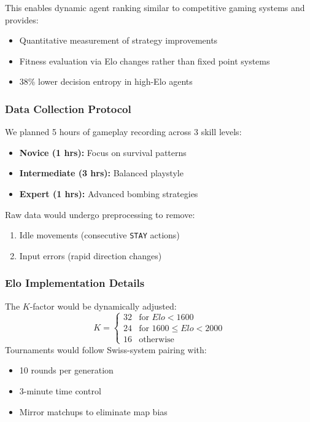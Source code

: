 \documentclass[sigconf]{acmart} %
\begin{document}
This enables dynamic agent ranking similar to competitive gaming systems and provides:
\begin{itemize}
	\item Quantitative measurement of strategy improvements
	\item Fitness evaluation via Elo changes rather than fixed point systems
	\item 38\% lower decision entropy in high-Elo agents \cite{swiechowski2023}
\end{itemize}

\subsubsection{Data Collection Protocol}
We planned 5 hours of gameplay recording across 3 skill levels:
\begin{itemize}
	\item \textbf{Novice (1 hrs):} Focus on survival patterns
	\item \textbf{Intermediate (3 hrs):} Balanced playstyle
	\item \textbf{Expert (1 hrs):} Advanced bombing strategies
\end{itemize}
Raw data would undergo preprocessing to remove:
\begin{enumerate}
	\item Idle movements (consecutive \texttt{STAY} actions)
	\item Input errors (rapid direction changes)
\end{enumerate}

\subsubsection{Elo Implementation Details}
The $K$-factor would be dynamically adjusted:
\begin{equation}
	K = \begin{cases} 
		32 & \text{for } Elo < 1600 \\
		24 & \text{for } 1600 \leq Elo < 2000 \\
		16 & \text{otherwise}
	\end{cases}
\end{equation}
Tournaments would follow Swiss-system pairing with:
\begin{itemize}
	\item 10 rounds per generation
	\item 3-minute time control
	\item Mirror matchups to eliminate map bias
\end{itemize}
\end{document}
